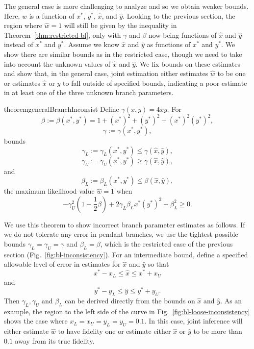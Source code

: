 \documentclass{article}
\begin{document}
The general case is more challenging to analyze and so we obtain weaker bounds.
Here, $\hat{w}$ is a function of $x^*$, $y^*$, $\hat{x}$, and $\hat{y}$.
Looking to the previous section, the region where $\hat{w}=1$ will still be given by the inequality in Theorem~\ref{thm:restricted-bl}, only with $\gamma$ and $\beta$ now being functions of $\hat{x}$ and $\hat{y}$ instead of $x^*$ and $y^*$.
Assume we know $\hat{x}$ and $\hat{y}$ as functions of $x^*$ and $y^*$.
We show there are similar bounds as in the restricted case, though we need to take into account the unknown values of $\hat{x}$ and $\hat{y}$.
We fix bounds on these estimates and show that, in the general case, joint estimation either estimates $\hat{w}$ to be one or estimates $\hat{x}$ or $\hat{y}$ to fall outside of specified bounds, indicating a poor estimate in at least one of the three unknown branch parameters.
\begin{restatable}{theorem}{generalBranchInconsist}
\label{thm:general-bl}
Define $\gamma(x, y) = 4xy$.
For
$$
\beta := \beta(x^*, y^*) = 1+(x^*)^2+(y^*)^2+(x^*)^2(y^*)^2,
$$
$$
\gamma := \gamma(x^*, y^*),
$$
bounds
$$
\gamma_L := \gamma_{L}(x^*, y^*) \le \gamma(\hat{x}, \hat{y}),
$$
$$
\gamma_U := \gamma_{U}(x^*, y^*) \ge \gamma(\hat{x}, \hat{y}),
$$
and
$$
\beta_L := \beta_{L}(x^*, y^*) \le \beta(\hat{x}, \hat{y}),
$$
the maximum likelihood value $\hat{w}=1$ when
$$
-\gamma_{U}^2\left(1 + \frac{1}{2}\beta\right) + 2\gamma_{L}\beta_{L}x^*(y^*)^2 + \beta_{L}^2 \ge 0.
$$
\end{restatable}
We use this theorem to show incorrect branch parameter estimates as follows.
If we do not tolerate any error in pendant branches, we use the tightest possible bounds $\gamma_{L} = \gamma_{U} = \gamma$ and $\beta_{L} = \beta$, which is the restricted case of the previous section (Fig.~\ref{fig:bl-inconsistency}).
For an intermediate bound, define a specified allowable level of error in estimates for $\hat{x}$ and $\hat{y}$ so that
$$
x^*-x_{L} \le \hat{x} \le x^*+x_{U}
$$
and
$$
y^*-y_{L} \le \hat{y} \le y^*+y_{U}.
$$
Then $\gamma_L, \gamma_U$ and $\beta_L$ can be derived directly from the bounds on $\hat{x}$ and $\hat{y}$.
As an example, the region to the left side of the curve in Fig.~\ref{fig:bl-loose-inconsistency} shows the case where $x_L=x_U=y_L=y_U=0.1$.
In this case, joint inference will either estimate $\hat{w}$ to have fidelity one or estimate either $\hat{x}$ or $\hat{y}$ to be more than $0.1$ away from its true fidelity.
\end{document}
